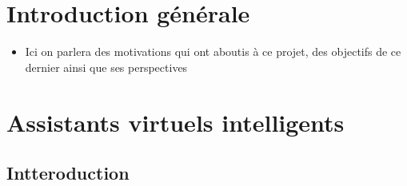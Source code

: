 \chapter{Introduction générale}
\begin{itemize}
	\item Ici on parlera des motivations qui ont aboutis à ce projet, des objectifs de ce dernier ainsi que ses perspectives
\end{itemize}


\chapter{Assistants virtuels intelligents}

\section{Intteroduction}
